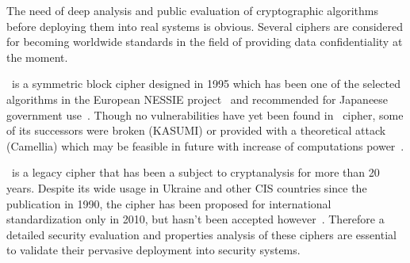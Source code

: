The need of deep analysis and public evaluation of cryptographic algorithms
before deploying them into real systems is obvious. Several ciphers are
considered for becoming worldwide standards in the field of providing data
confidentiality at the moment. 

\misty\ is a symmetric block cipher designed in 1995 which has been one of the
selected algorithms in the European NESSIE project~\cite{Preneel_neweuropean}
and recommended for Japaneese government use~\cite{cryptrec:misty}. Though no
vulnerabilities have yet been found in \misty\ cipher, some of its successors
were broken (KASUMI) or provided with a theoretical attack (Camellia) which may
be feasible in future with increase of computations
power~\cite{Biryukov03decanniere}.

\gost\ is a legacy cipher that has been a subject to cryptanalysis for more than
20 years. Despite its wide usage in Ukraine and other CIS countries since the
publication in 1990, the cipher has been proposed for international
standardization only in 2010, but hasn't been accepted
however~\cite{isoiec-18033}. Therefore a detailed security evaluation and
properties analysis of these ciphers are essential to validate their pervasive
deployment into security systems.

